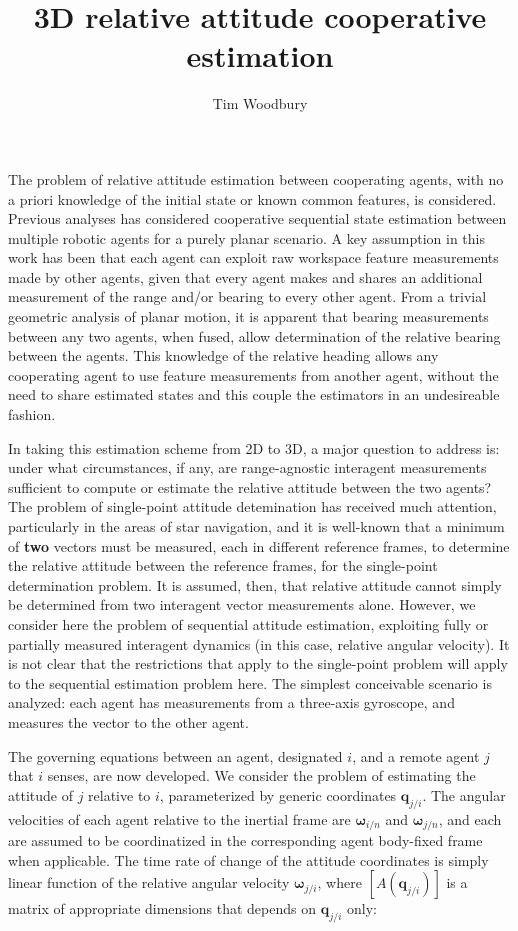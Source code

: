 \documentclass{aiaa-tc}
\title{ 3D relative attitude cooperative estimation }
\author{Tim Woodbury}
\newcommand{\B}[1]{\textbf{#1}} %
\newcommand{\BG}[1]{{\bm #1}}           %
\begin{document}
\maketitle

The problem of relative attitude estimation between cooperating agents, with no a priori knowledge of the initial state or known common features, is considered. Previous analyses has considered cooperative sequential state estimation between multiple robotic agents for a purely planar scenario. A key assumption in this work has been that each agent can exploit raw workspace feature measurements made by other agents, given that every agent makes and shares an additional measurement of the range and/or bearing to every other agent. From a trivial geometric analysis of planar motion, it is apparent that bearing measurements between any two agents, when fused, allow determination of the relative bearing between the agents. This knowledge of the relative heading allows any cooperating agent to use feature measurements from another agent, without the need to share estimated states and this couple the estimators in an undesireable fashion.

In taking this estimation scheme from 2D to 3D, a major question to address is: under what circumstances, if any, are range-agnostic interagent measurements sufficient to compute or estimate the relative attitude between the two agents? The problem of single-point attitude detemination has received much attention, particularly in the areas of star navigation, and it is well-known that a minimum of \textbf{two} vectors must be measured, each in different reference frames, to determine the relative attitude between the reference frames, for the single-point determination problem. It is assumed, then, that relative attitude cannot simply be determined from two interagent vector measurements alone. However, we consider here the problem of sequential attitude estimation, exploiting fully or partially measured interagent dynamics (in this case, relative angular velocity). It is not clear that the restrictions that apply to the single-point problem will apply to the sequential estimation problem here. The simplest conceivable scenario is analyzed: each agent has measurements from a three-axis gyroscope, and measures the vector to the other agent.

The governing equations between an agent, designated $i$, and a remote agent $j$ that $i$ senses, are now developed. We consider the problem of estimating the attitude of $j$ relative to $i$, parameterized by generic coordinates $\B{q}_{j/i}$. The angular velocities of each agent relative to the inertial frame are $\BG{\omega}_{i/n}$ and $\BG{\omega}_{j/n}$, and each are assumed to be coordinatized in the corresponding agent body-fixed frame when applicable. The time rate of change of the attitude coordinates is simply linear function of the relative angular velocity $\BG{\omega}_{j/i}$, where $[A(\B{q}_{j/i})]$ is a matrix of appropriate dimensions that depends on $\B{q}_{j/i}$ only:
\end{document}
